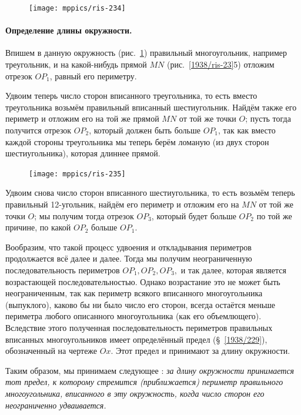 \documentclass[twoside]{book}
\begin{document}
\begin{figure}
\centering
\texttt{[image: mppics/ris-234]}
\caption{}\label{1938/ris-234}
\end{figure}

\paragraph{Определение длины окружности.}\label{1938/234}
Впишем в данную окружность (рис.~\ref{1938/ris-234}) правильный многоугольник, например треугольник, и на какой-нибудь прямой $MN$ (рис.~\ref{1938/ris-23}5) отложим отрезок $OP_1$, равный его периметру.

Удвоим теперь число сторон вписанного треугольника, то есть
вместо треугольника возьмём правильный вписанный шестиугольник.
Найдём также его периметр и отложим его на той же прямой $MN$ от той же точки $O$;
пусть тогда получится отрезок $OP_2$, который должен быть больше $OP_1$, так как вместо каждой стороны треугольника мы теперь берём ломаную (из двух сторон шестиугольника), которая длиннее прямой.

\begin{figure}[h!]
\centering
\texttt{[image: mppics/ris-235]}
\caption{}\label{1938/ris-235}
\end{figure}

Удвоим снова число сторон вписанного шестиугольника, то есть возьмём теперь правильный 12-угольник, найдём его периметр и отложим его на $MN$ от той же точки $O$; 
мы получим тогда отрезок $OP_3$, который будет больше $OP_2$ по той же причине, по какой $OP_2$ больше $OP_1$.

Вообразим, что такой процесс удвоения и откладывания периметров продолжается всё далее и далее.
Тогда мы получим неограниченную последовательность периметров $OP_1, OP_2, OP_3,$ и так далее, которая является возрастающей последовательностью.
Однако возрастание это не может быть неограниченным, так как периметр всякого вписанного многоугольника (выпуклого), каково бы ни было число его сторон, всегда остаётся меньше периметра любого описанного многоугольника (как его объемлющего).
Вследствие этого полученная последовательность периметров правильных вписанных многоугольников имеет определённый предел (§~\ref{1938/229}), обозначенный на чертеже $Ox$.
Этот предел и принимают за длину окружности.

Таким образом, мы принимаем следующее :
\emph{за длину окружности принимается тот предел, к которому стремится (приближается) периметр правильного многоугольника, вписанного в эту окружность, когда число сторон его неограниченно удваивается.}
\end{document}
